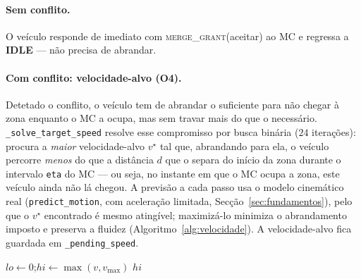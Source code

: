 \documentclass[11pt,a4paper]{article}
\begin{document}
\paragraph{Sem conflito.} O veículo responde de imediato com \textsc{merge\_grant}(aceitar)
ao MC e regressa a \textbf{IDLE} --- não precisa de abrandar.

\paragraph{Com conflito: velocidade-alvo (O4).} Detetado o conflito, o veículo tem de
abrandar o suficiente para não chegar à zona enquanto o MC a ocupa, mas sem travar mais do
que o necessário. \texttt{\_solve\_target\_speed} resolve esse compromisso por busca binária
($24$ iterações): procura a \emph{maior} velocidade-alvo $v^\star$ tal que, abrandando para
ela, o veículo percorre \emph{menos} do que a distância $d$ que o separa do início da zona
durante o intervalo \texttt{eta} do MC --- ou seja, no instante em que o MC ocupa a zona,
este veículo ainda não lá chegou. A previsão a cada passo usa o modelo cinemático real
(\texttt{predict\_motion}, com aceleração limitada, Secção~\ref{sec:fundamentos}), pelo que o
$v^\star$ encontrado é mesmo atingível; maximizá-lo minimiza o abrandamento imposto e preserva
a fluidez (Algoritmo~\ref{alg:velocidade}). A velocidade-alvo fica guardada em
\texttt{\_pending\_speed}.

\begin{algorithm}[H]
\caption{Velocidade-alvo (\texttt{\_solve\_target\_speed})}
\label{alg:velocidade}
$lo \leftarrow 0$;\quad $hi \leftarrow \max(v, v_{\max})$\;
\Return $hi$\;
\end{algorithm}
\end{document}
